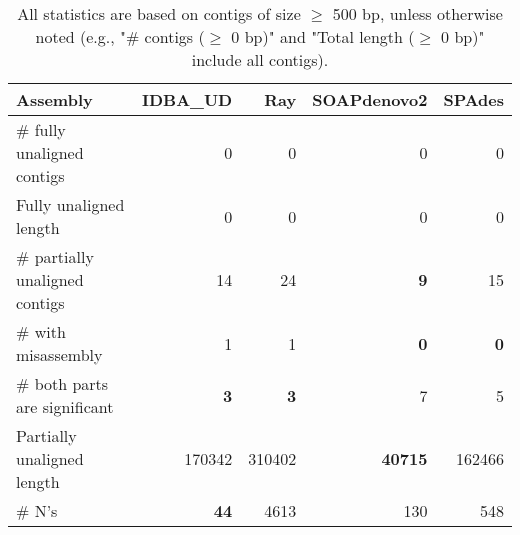 \documentclass[12pt,a4paper]{article}
\begin{document}
\begin{table}[ht]
\begin{center}
\caption{All statistics are based on contigs of size $\geq$ 500 bp, unless otherwise noted (e.g., "\# contigs ($\geq$ 0 bp)" and "Total length ($\geq$ 0 bp)" include all contigs).}
\begin{tabular}{|l*{4}{|r}|}
\hline
Assembly & IDBA\_UD & Ray & SOAPdenovo2 & SPAdes \\ \hline
\# fully unaligned contigs & 0 & 0 & 0 & 0 \\ \hline
Fully unaligned length & 0 & 0 & 0 & 0 \\ \hline
\# partially unaligned contigs & 14 & 24 & {\bf 9} & 15 \\ \hline
\hspace{5mm}\# with misassembly & 1 & 1 & {\bf 0} & {\bf 0} \\ \hline
\hspace{5mm}\# both parts are significant & {\bf 3} & {\bf 3} & 7 & 5 \\ \hline
Partially unaligned length & 170342 & 310402 & {\bf 40715} & 162466 \\ \hline
\# N's & {\bf 44} & 4613 & 130 & 548 \\ \hline
\end{tabular}
\end{center}
\end{table}
\end{document}
